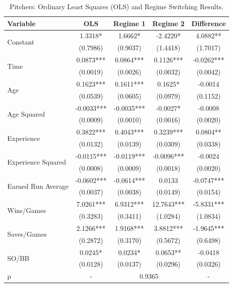 \documentclass[12pt]{article}
\begin{document}
\begin{table} \caption{Pitchers: Ordinary Least Squares (OLS) and Regime Switching Results.}
\begin{center}
\begin{tabular}{l|c|cc|c} 
 Variable & OLS & Regime 1 & Regime 2 & Difference \\ \hline 

 \multirow{2}{*}{Constant} & 1.3318* & 1.6662* & -2.4220* & 4.0882** \\ 
 & (0.7986) & (0.9037) & (1.4418) & (1.7017) \\ [0.4pc]
 \multirow{2}{*}{Time} & 0.0873*** & 0.0864*** & 0.1126*** & -0.0262*** \\ 
 & (0.0019) & (0.0026) & (0.0032) & (0.0042) \\ [0.4pc]
 \multirow{2}{*}{Age} & 0.1623*** & 0.1611*** & 0.1625* & -0.0014  \\ 
 & (0.0539) & (0.0605) & (0.0979) & (0.1152) \\ [0.4pc]
 \multirow{2}{*}{Age Squared} & -0.0033*** & -0.0035*** & -0.0027* & -0.0008  \\ 
 & (0.0009) & (0.0010) & (0.0016) & (0.0020) \\ [0.4pc]
 \multirow{2}{*}{Experience} & 0.3822*** & 0.4043*** & 0.3239*** & 0.0804** \\ 
 & (0.0132) & (0.0139) & (0.0309) & (0.0338) \\ [0.4pc]
 \multirow{2}{*}{Experience Squared} & -0.0115*** & -0.0119*** & -0.0096*** & -0.0024  \\ 
 & (0.0008) & (0.0009) & (0.0018) & (0.0020) \\ [0.4pc]
 \multirow{2}{*}{Earned Run Average} & -0.0602*** & -0.0614*** & 0.0133  & -0.0747*** \\ 
 & (0.0037) & (0.0038) & (0.0149) & (0.0154) \\ [0.4pc]
 \multirow{2}{*}{Wins/Games} & 7.0261*** & 6.9312*** & 12.7643*** & -5.8331*** \\ 
 & (0.3283) & (0.3411) & (1.0284) & (1.0834) \\ [0.4pc]
 \multirow{2}{*}{Saves/Games} & 2.1266*** & 1.9168*** & 3.8812*** & -1.9645*** \\ 
 & (0.2872) & (0.3170) & (0.5672) & (0.6498) \\ [0.4pc]
 \multirow{2}{*}{SO/BB} & 0.0245* & 0.0234* & 0.0653** & -0.0418  \\ 
 & (0.0128) & (0.0137) & (0.0296) & (0.0326) \\ [0.4pc]\hline 
\multirow{2}{*}{p} & - & \multicolumn{2}{c|}{0.9365} & - \\ 

\end{tabular}
\end{center}
\end{table}
\end{document}
